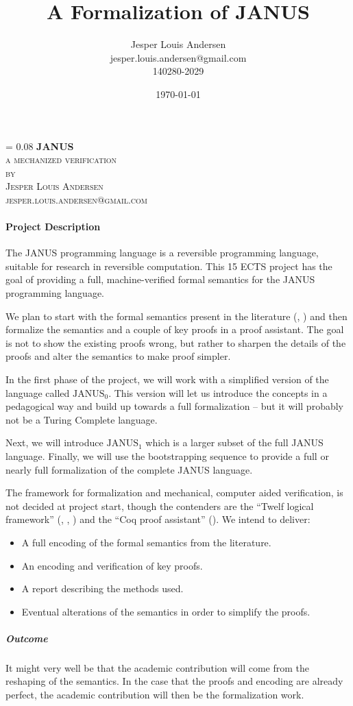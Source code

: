 \documentclass[a4paper, oneside, 10pt, draft]{memoir}
\author{Jesper Louis
  Andersen\\jesper.louis.andersen@gmail.com\\140280-2029}
\title{A Formalization of JANUS}
\date{\today}
\makeatletter
\renewcommand*{\titleM}{\begingroup%
  \drop = 0.08\textheight
  \centering
  {\Huge\bfseries JANUS}\\[\baselineskip]
  {\scshape a mechanized verification}\\[\baselineskip]
  {\scshape by}\\[\baselineskip]
  {\large\scshape Jesper Louis Andersen\\jesper.louis.andersen@gmail.com}\par
  \endgroup}
\makeatother
\begin{document}
\titleM

\paragraph{Project Description}

The JANUS programming language is a reversible programming language,
suitable for research in reversible computation. This 15 ECTS project
has the goal of providing a full, machine-verified formal semantics
for the JANUS programming language.

We plan to start with the formal semantics present in the literature
(\cite{glueck2007}, \cite{glueck2008}) and then formalize the
semantics and a couple of key proofs in a proof assistant. The goal is
not to show the existing proofs wrong, but rather to sharpen the
details of the proofs and alter the semantics to make proof simpler.

In the first phase of the project, we will work with a simplified
version of the language called $\mathrm{JANUS}_0$. This version will
let us introduce the concepts in a pedagogical way and build up
towards a full formalization -- but it will probably not be a Turing
Complete language.

Next, we will introduce $\mathrm{JANUS_1}$ which is a larger subset of
the full JANUS language. Finally, we will use the bootstrapping
sequence to provide a full or nearly full formalization of the
complete JANUS language.

The framework for formalization and mechanical, computer aided
verification, is not decided at project start, though the contenders
are the ``Twelf logical framework'' (\cite{harper+07:mechanizing},
\cite{hhp93lf}, \cite{twelf}) and the ``Coq proof assistant'' (\cite{coqdev}).
We intend to deliver:
\begin{itemize}
\item A full encoding of the formal semantics from the literature.
\item An encoding and verification of key proofs.
\item A report describing the methods used.
\item Eventual alterations of the semantics in order to simplify the
  proofs.
\end{itemize}

\subparagraph{Outcome}
\label{sec:consequence}

It might very well be that the academic contribution will come from
the reshaping of the semantics. In the case that the proofs and
encoding are already perfect, the academic contribution will then be
the formalization work.
\end{document}
